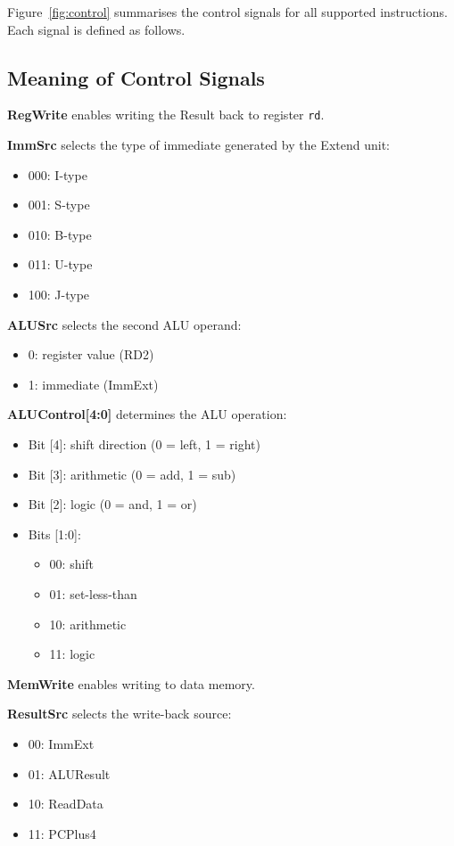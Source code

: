 \documentclass[acmsmall]{acmart}
\begin{document}
Figure~\ref{fig:control} summarises the control signals for all supported instructions. Each signal is defined as follows.

\subsection {Meaning of Control Signals}

\textbf{RegWrite} enables writing the Result back to register \texttt{rd}.  

\textbf{ImmSrc} selects the type of immediate generated by the Extend unit:
\begin{itemize}
    \item 000: I-type
    \item 001: S-type
    \item 010: B-type
    \item 011: U-type
    \item 100: J-type
\end{itemize}

\textbf{ALUSrc} selects the second ALU operand:
\begin{itemize}
    \item 0: register value (RD2)
    \item 1: immediate (ImmExt)
\end{itemize}

\textbf{ALUControl[4:0]} determines the ALU operation:
\begin{itemize}
    \item Bit [4]: shift direction (0 = left, 1 = right)
    \item Bit [3]: arithmetic (0 = add, 1 = sub)
    \item Bit [2]: logic (0 = and, 1 = or)
    \item Bits [1:0]:
    \begin{itemize}
        \item 00: shift
        \item 01: set-less-than
        \item 10: arithmetic
        \item 11: logic
    \end{itemize}
\end{itemize}

\textbf{MemWrite} enables writing to data memory.

\textbf{ResultSrc} selects the write-back source:
\begin{itemize}
    \item 00: ImmExt
    \item 01: ALUResult
    \item 10: ReadData
    \item 11: PCPlus4
\end{itemize}
\end{document}
